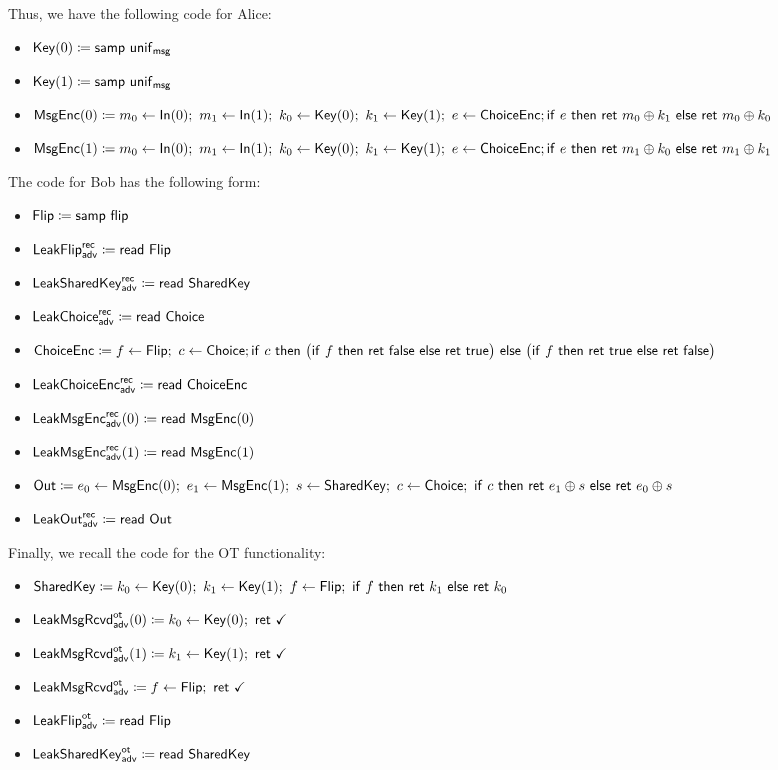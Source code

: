 Thus, we have the following code for Alice:
\begin{itemize}
\item $\mathsf{Key}(0) \coloneqq \mathsf{samp} \ \mathsf{unif}_{\mathsf{msg}}$
\item $\mathsf{Key}(1) \coloneqq \mathsf{samp} \ \mathsf{unif}_{\mathsf{msg}}$
\item $\mathsf{MsgEnc}(0) \coloneqq m_0 \leftarrow \mathsf{In}(0); \ m_1 \leftarrow \mathsf{In}(1); \ k_0 \leftarrow \mathsf{Key}(0); \ k_1 \leftarrow \mathsf{Key}(1); \ e \leftarrow \mathsf{ChoiceEnc}; \\ \mathsf{if} \ e \ \mathsf{then} \ \mathsf{ret} \ m_0 \oplus k_1 \ \mathsf{else} \ \mathsf{ret} \ m_0 \oplus k_0$
\item $\mathsf{MsgEnc}(1) \coloneqq m_0 \leftarrow \mathsf{In}(0); \ m_1 \leftarrow \mathsf{In}(1); \ k_0 \leftarrow \mathsf{Key}(0); \ k_1 \leftarrow \mathsf{Key}(1); \ e \leftarrow \mathsf{ChoiceEnc}; \\ \mathsf{if} \ e \ \mathsf{then} \ \mathsf{ret} \ m_1 \oplus k_0 \ \mathsf{else} \ \mathsf{ret} \ m_1 \oplus k_1$
\end{itemize}
The code for Bob has the following form:
\begin{itemize}
\item $\mathsf{Flip} \coloneqq \mathsf{samp} \ \mathsf{flip}$
\item {\color{blue} $\mathsf{LeakFlip}^{\mathsf{rec}}_{\mathsf{adv}} \coloneqq \mathsf{read} \ \mathsf{Flip}$}
\item {\color{blue} $\mathsf{LeakSharedKey}^{\mathsf{rec}}_{\mathsf{adv}} \coloneqq \mathsf{read} \ \mathsf{SharedKey}$}
\item {\color{blue} $\mathsf{LeakChoice}^{\mathsf{rec}}_{\mathsf{adv}} \coloneqq \mathsf{read} \ \mathsf{Choice}$}
\item $\mathsf{ChoiceEnc} \coloneqq f \leftarrow \mathsf{Flip}; \ c \leftarrow \mathsf{Choice}; \\ \mathsf{if} \ c \ \mathsf{then} \ \big(\mathsf{if} \ f \ \mathsf{then} \ \mathsf{ret} \ \mathsf{false} \ \mathsf{else} \ \mathsf{ret} \ \mathsf{true}\big) \ \mathsf{else} \ \big(\mathsf{if} \ f \ \mathsf{then} \ \mathsf{ret} \ \mathsf{true} \ \mathsf{else} \ \mathsf{ret} \ \mathsf{false}\big)$
\item {\color{blue} $\mathsf{LeakChoiceEnc}^{\mathsf{rec}}_{\mathsf{adv}} \coloneqq \mathsf{read} \ \mathsf{ChoiceEnc}$}
\item {\color{blue} $\mathsf{LeakMsgEnc}^{\mathsf{rec}}_{\mathsf{adv}}(0) \coloneqq \mathsf{read} \ \mathsf{MsgEnc}(0)$}
\item {\color{blue} $\mathsf{LeakMsgEnc}^{\mathsf{rec}}_{\mathsf{adv}}(1) \coloneqq \mathsf{read} \ \mathsf{MsgEnc}(1)$}
\item $\mathsf{Out} \coloneqq e_0 \leftarrow \mathsf{MsgEnc}(0); \ e_1 \leftarrow \mathsf{MsgEnc}(1); \ s \leftarrow \mathsf{SharedKey}; \ c \leftarrow \mathsf{Choice}; \ \mathsf{if} \ c \ \mathsf{then} \ \mathsf{ret} \ e_1 \oplus s \ \mathsf{else} \ \mathsf{ret} \ e_0 \oplus s$
\item {\color{blue} $\mathsf{LeakOut}^{\mathsf{rec}}_{\mathsf{adv}} \coloneqq \mathsf{read} \ \mathsf{Out}$}
\end{itemize}
Finally, we recall the code for the OT functionality:
\begin{itemize}
\item $\SharedKey \coloneqq k_0 \leftarrow \Key(0); \ k_1 \leftarrow \Key(1); \ f \leftarrow \Flip; \ \ifte{f}{\ret{k_1}}{\ret{k_0}}$
\item {\color{blue} $\LeakKeyRcvd^\ot_\adv(0) \coloneqq k_0 \leftarrow \Key(0); \ \ret{\checkmark}$}
\item {\color{blue} $\LeakKeyRcvd^\ot_\adv(1) \coloneqq k_1 \leftarrow \Key(1); \ \ret{\checkmark}$}
\item {\color{blue} $\mathsf{LeakMsgRcvd}^{\mathsf{ot}}_{\mathsf{adv}} \coloneqq f \leftarrow \mathsf{Flip}; \ \mathsf{ret} \ \checkmark$}
\item {\color{blue} $\mathsf{LeakFlip}^{\mathsf{ot}}_{\mathsf{adv}} \coloneqq \mathsf{read} \ \mathsf{Flip}$}
\item {\color{blue} $\mathsf{LeakSharedKey}^{\mathsf{ot}}_{\mathsf{adv}} \coloneqq \mathsf{read} \ \mathsf{SharedKey}$}
\end{itemize}
